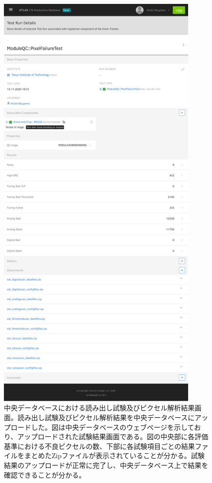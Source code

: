 \begin{figure}[bpt]\centering
\includegraphics[width=10cm]{./pixel_test_result.pdf}
\caption[中央データベースにおける読み出し試験及びピクセル解析結果画面]{中央データベースにおける読み出し試験及びピクセル解析結果画面。読み出し試験及びピクセル解析結果を中央データベースにアップロードした。図は中央データベースのウェブページを示しており、アップロードされた試験結果画面である。図の中央部に各評価基準における不良ピクセルの数、下部に各試験項目ごとの結果ファイルをまとめたZipファイルが表示されていることが分かる。試験結果のアップロードが正常に完了し、中央データベース上で結果を確認できることが分かる。}
\label{demo_upload_to_pd}
\end{figure}

